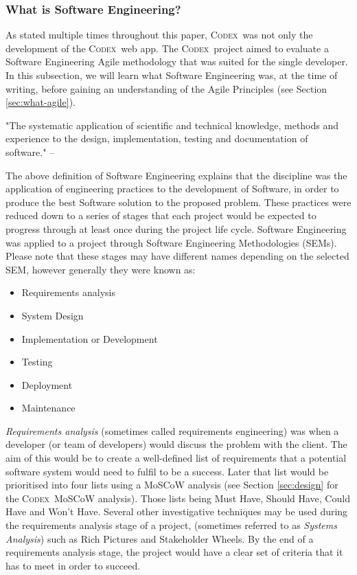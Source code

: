 \documentclass[final]{cmpreport}
\newcommand{\Codex}{\textsc{Codex}}
\begin{document}
			\subsubsection{What is Software Engineering?} \label{sec:what-se}
			As stated multiple times throughout this paper, \Codex \ was not only the development of the \Codex \ web app. The \Codex \ project aimed to evaluate a Software Engineering Agile methodology that was suited for the single developer. In this subsection, we will learn what Software Engineering was, at the time of writing, before gaining an understanding of the Agile Principles (see Section \ref{sec:what-agile}). 
			
			\begin{displayquote}
				"The systematic application of scientific and technical knowledge, methods and experience to the design, implementation, testing and documentation of software." -- \cite{SE-def}
			\end{displayquote}
		
			The above definition of Software Engineering explains that the discipline was the application of engineering practices to the development of Software, in order to produce the best Software solution to the proposed problem. These practices were reduced down to a series of stages that each project would be expected to progress through at least once during the project life cycle. Software Engineering was applied to a project through Software Engineering Methodologies (SEMs). Please note that these stages may have different names depending on the selected SEM, however generally they were known as:
			
			\begin{itemize}
				\item Requirements analysis
				\item System Design
				\item Implementation or Development
				\item Testing
				\item Deployment
				\item Maintenance				
			\end{itemize}
		
			\emph{Requirements analysis} (sometimes called requirements engineering) was when a developer (or team of developers) would discuss the problem with the client. The aim of this would be to create a well-defined list of requirements that a potential software system would need to fulfil to be a success. Later that list would be prioritised into four lists using a MoSCoW analysis (see Section \ref{sec:design} for the \Codex \ MoSCoW analysis). Those lists being Must Have, Should Have, Could Have and Won't Have. Several other investigative techniques may be used during the requirements analysis stage of a project, (sometimes referred to as \emph{Systems Analysis}) such as Rich Pictures and Stakeholder Wheels. By the end of a requirements analysis stage, the project would have a clear set of criteria that it has to meet in order to succeed.
			
\end{document}
